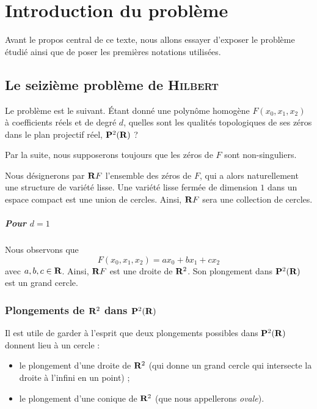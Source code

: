 \documentclass{livre}
\date{\today}
\begin{document}
\tableofcontents

\newpage
\chapter{Introduction du problème}

Avant le propos central de ce texte, nous allons essayer d'exposer le problème étudié ainsi que de poser les premières notations utilisées.

\section{Le seizième problème de \textsc{Hilbert}}

Le problème est le suivant. \'Etant donné une polynôme homogène $F(x_0,x_1,x_2)$ à coefficients réels et de degré $d$, quelles sont les qualités topologiques de ses zéros dans le plan projectif réel, $\mathbf{P}^{2}(\mathbf{R})$ ? 

Par la suite, nous supposerons toujours que les zéros de $F$ sont non-singuliers.

Nous désignerons par $\mathbf{R} F$ l'ensemble des zéros de $F$, qui a alors  naturellement une structure de variété lisse. Une variété lisse fermée de dimension $1$ dans un espace compact est une union de cercles. Ainsi, $\mathbf{R} F$ sera une collection de cercles.


\paragraph{Pour $d=1$}Nous observons que \[ F(x_0,x_1,x_2) = ax_0 + bx_1+cx_2 \]avec $a,b,c\in \mathbf{R}$. Ainsi, $\mathbf{R} F$ est une droite de $\mathbf{R}^{2}$. Son plongement dans $\mathbf{P}^{2}(\mathbf{R})$ est un grand cercle.

\subsection*{Plongements de $\mathbf{R}^{2}$ dans $\mathbf{P}^{2}(\mathbf{R})$}

Il est utile de garder à l'esprit que deux plongements possibles dans $\mathbf{P}^{2}(\mathbf{R})$ donnent lieu à un cercle :

\begin{itemize}
\item le plongement d'une droite de $\mathbf{R}^{2}$ (qui donne un grand cercle qui intersecte la droite à l'infini en un point) ;
\item le plongement d'une conique de $\mathbf{R}^{2}$ (que nous appellerons \textit{ovale}).
\end{itemize}
\end{document}
